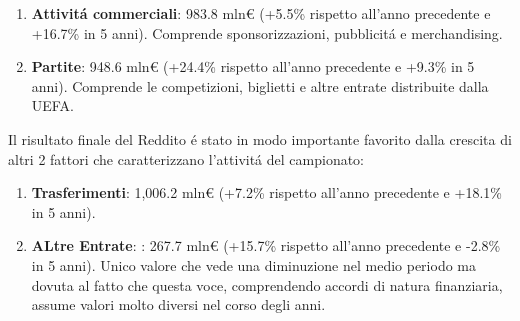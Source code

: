 \documentclass[
    corpo=11.5pt,
    oneside,
    evenboxes,
    tipotesi=triennale,
    stile=classica,
    oldstyle,
    autoretitolo,
    greek,
]{toptesi}
\begin{document}
\begin{interlinea}{1.5}
\begin{enumerate}
    \item \textbf{Attivit\'a commerciali}: 983.8 mln€ (+5.5\% rispetto all'anno precedente e +16.7\% in 5 anni). Comprende sponsorizzazioni,
    pubblicit\'a e merchandising.
    \item \textbf{Partite}: 948.6 mln€ (+24.4\% rispetto all'anno precedente e +9.3\% in 5 anni). Comprende le competizioni, biglietti 
    e altre entrate distribuite dalla UEFA.
\end{enumerate}
Il risultato finale del Reddito \'e stato in modo importante favorito dalla crescita di altri 2 fattori che caratterizzano l'attivit\'a del
campionato:
\begin{enumerate}
    \item \textbf{Trasferimenti}: 1,006.2 mln€ (+7.2\% rispetto all'anno precedente e +18.1\% in 5 anni).
    \item \textbf{ALtre Entrate}: : 267.7 mln€ (+15.7\% rispetto all'anno precedente e -2.8\% in 5 anni). Unico valore che vede una diminuzione
    nel medio periodo ma dovuta al fatto che questa voce, comprendendo accordi di natura finanziaria, assume valori molto diversi nel corso degli anni.
\end{enumerate}


\end{interlinea}
\end{document}
